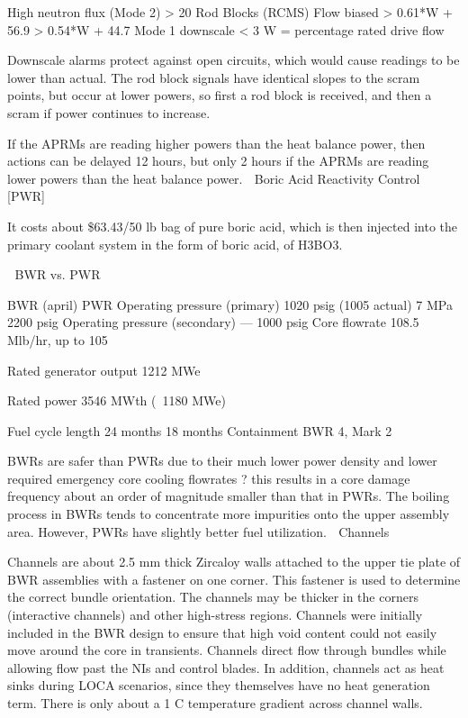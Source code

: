 \documentclass[10pt]{article}
\begin{document}
High neutron flux (Mode 2)
> 20%
Rod Blocks (RCMS)
Flow biased
> 0.61*W + 56.9%
> 0.54*W + 44.7%
Mode 1 downscale
< 3%
W = percentage rated drive flow

Downscale alarms protect against open circuits, which would cause readings to be lower than actual. The rod block signals have identical slopes to the scram points, but occur at lower powers, so first a rod block is received, and then a scram if power continues to increase. 

If the APRMs are reading higher powers than the heat balance power, then actions can be delayed 12 hours, but only 2 hours if the APRMs are reading lower powers than the heat balance power. 
Boric Acid Reactivity Control [PWR]

It costs about \$63.43/50 lb bag of pure boric acid, which is then injected into the primary coolant system in the form of boric acid, of H3BO3. 


BWR vs. PWR


BWR (april)
PWR
Operating pressure (primary)
1020 psig (1005 actual)
7 MPa
2200 psig
Operating pressure (secondary)
---
1000 psig
Core flowrate
108.5 Mlb/hr, up to 105%

Rated generator output
1212 MWe

Rated power
3546 MWth (~1180 MWe)

Fuel cycle length
24 months
18 months
Containment
BWR 4, Mark 2


BWRs are safer than PWRs due to their much lower power density and lower required emergency core cooling flowrates ? this results in a core damage frequency about an order of magnitude smaller than that in PWRs. The boiling process in BWRs tends to concentrate more impurities onto the upper assembly area. However, PWRs have slightly better fuel utilization. 
Channels

Channels are about 2.5 mm thick Zircaloy walls attached to the upper tie plate of BWR assemblies with a fastener on one corner. This fastener is used to determine the correct bundle orientation. The channels may be thicker in the corners (interactive channels) and other high-stress regions. Channels were initially included in the BWR design to ensure that high void content could not easily move around the core in transients. Channels direct flow through bundles while allowing flow past the NIs and control blades. In addition, channels act as heat sinks during LOCA scenarios, since they themselves have no heat generation term. There is only about a 1 C temperature gradient across channel walls. 
\end{document}
